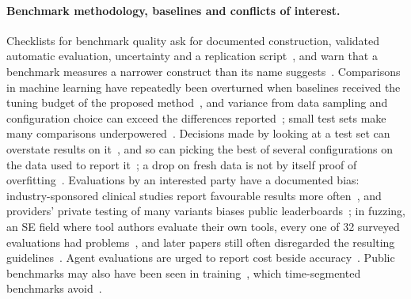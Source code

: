 \documentclass[11pt,a4paper]{article}
\begin{document}
\paragraph{Benchmark methodology, baselines and conflicts of interest.}
Checklists for benchmark quality ask for documented construction, validated
automatic evaluation, uncertainty and a replication
script~\cite{reuel2024betterbench,zhu2025abc,gebru2021datasheets}, and warn
that a benchmark measures a narrower construct than its name
suggests~\cite{raji2021}. Comparisons in machine learning have repeatedly been
overturned when baselines received the tuning budget of the proposed
method~\cite{melis2018,lucic2018,dodge2019}, and variance from data sampling
and configuration choice can exceed the differences
reported~\cite{bouthillier2021}; small test sets make many comparisons
underpowered~\cite{card2020power}. Decisions made by looking at a test set can
overstate results on it~\cite{dwork2015}, and so can picking the best of
several configurations on the data used to report it~\cite{cawley2010}; a
drop on fresh data is not by itself proof of overfitting~\cite{recht2019}.
Evaluations by an interested party have a documented bias: industry-sponsored
clinical studies report favourable results more often~\cite{lundh2017}, and
providers' private testing of many variants biases public
leaderboards~\cite{singh2025leaderboard}; in fuzzing, an SE field where tool
authors evaluate their own tools, every one of 32 surveyed evaluations had
problems~\cite{klees2018}, and later papers still often disregarded the
resulting guidelines~\cite{schloegel2024}. Agent evaluations are urged to
report cost beside accuracy~\cite{kapoor2024agents}. Public benchmarks may also
have been seen in training~\cite{sainz2023,riddell2024}, which time-segmented
benchmarks avoid~\cite{jain2025livecodebench,zhang2025swebenchlive}.
\end{document}
